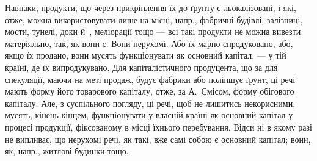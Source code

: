 Навпаки, продукти, що через прикріплення їх до ґрунту є льокалізовані,
і які, отже, можна використовувати лише на місці, напр., фабричні
будівлі, залізниці, мости, тунелі, доки й~, меліорації тощо —
всі такі продукти не можна вивезти матеріяльно, так, як вони є. Вони
нерухомі. Або їх марно спродуковано, або, якщо їх продано, вони мусять
функціонувати як основний капітал, — у тій країні, де їх випродукувано.
Для капіталістичного продуцента, що за для спекуляції, маючи
на меті продаж, будує фабрики або поліпшує ґрунт, ці речі мають форму
його товарового капіталу, отже, за А.~Смісом, форму обігового капіталу.
Але, з суспільного погляду, ці речі, щоб не лишитись некорисними,
мусять, кінець-кінцем, функціонувати у власній країні як основний
капітал у процесі продукції, фіксованому в місці їхнього перебування. Відси
ні в якому разі не випливає, що нерухомі речі, як такі, вже самі
собою є основний капітал; вони, як, напр., житлові будинки тощо,
\parbreak{}  %
